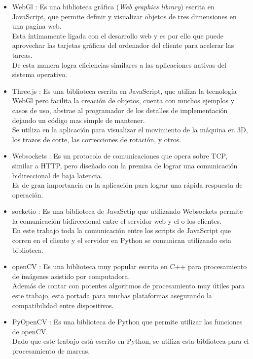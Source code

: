 \begin{itemize}
{         También se utilizan bibliotecas de terceros para diferentes usos escritas en este lenguaje, lo que permite reutilizar código. \\
      }
      \item{WebGl \citep{WEBSITE:webgl}: Es una biblioteca gráfica (\textit{Web graphics library}) escrita en JavaScript, que permite definir y visualizar objetos de tres dimensiones en una pagina web.\\
         Esta íntimamente ligada con el desarrollo web y es por ello que puede aprovechar las tarjetas gráficas del ordenador del cliente para acelerar las tareas.\\
         De esta manera logra eficiencias similares a las aplicaciones nativas del sistema operativo.
      }
      \item{Three.js \citep{WEBSITE:threejs}: Es una biblioteca escrita en JavaScript, que utiliza la tecnología WebGl pero facilita la creación de objetos, cuenta con muchos ejemplos y casos de uso, abstrae al programador de los detalles de implementación dejando un código mas simple de mantener.\\
         Se utiliza en la aplicación para visualizar el movimiento de la máquina en 3D, los trazos de corte, las correcciones de rotación, y otros. \\
      }
      \item{Websockets \citep{WEBSITE:websockets}: Es un protocolo de comunicaciones que opera sobre TCP, similar a HTTP, pero diseñado con la premisa de lograr una comunicación bidireccional de baja latencia.\\
         Es de gran importancia en la aplicación para lograr una rápida respuesta de operación.
      }
      \item{socketio \citep{WEBSITE:socketio}: Es una biblioteca de JavaSctip que utilizando Websockets permite la comunicación bidireccional entre el servidor web y el o los clientes.\\
         En este trabajo toda la comunicación entre los scripts de JavaScript que corren en el cliente y el servidor en Python se comunican utilizando esta biblioteca.
      }
   \item{openCV \citep{WEBSITE:opencv}: Es una biblioteca muy popular escrita en C++ para procesamiento de imágenes asistido por computadora.\\
         Además de contar con potentes algoritmos de procesamiento muy útiles para este trabajo, esta portada para muchas plataformas asegurando la compatibilidad entre dispositivos.
      }
   \item{PyOpenCV \citep{WEBSITE:pyopencv}: Es una biblioteca de Python que permite utilizar las funciones de openCV.\\
         Dado que este trabajo está escrito en Python, se utiliza esta biblioteca para el procesamiento de marcas.
      }
\end{itemize}

